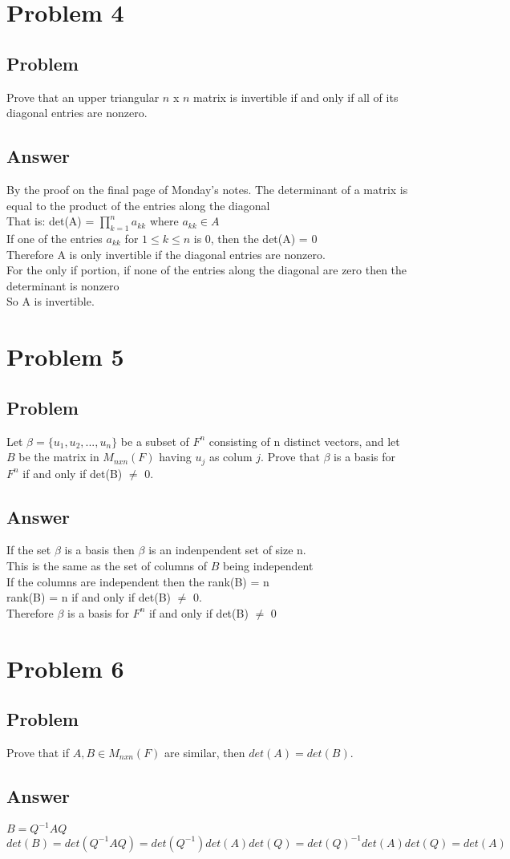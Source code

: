 \documentclass{article}
\begin{document}
\section*{Problem 4}
\subsection*{Problem}
Prove that an upper triangular \(n\) x \(n\) matrix is invertible if and only if all of its diagonal entries are nonzero.
\subsection*{Answer}
By the proof on the final page of Monday's notes. The determinant of a matrix is equal to the product of the entries along the diagonal
\\ That is: det(A) = \(\prod\limits_{k=1}^{n} a_{kk}\) where \(a_{kk} \in A\)
\\ If one of the entries \(a_{kk}\) for \(1 \le k \le n\) is 0, then the det(A) = 0
\\ Therefore A is only invertible if the diagonal entries are nonzero.
\\ For the only if portion, if none of the entries along the diagonal are zero then the determinant is nonzero
\\ So A is invertible.
\section*{Problem 5}
\subsection*{Problem}
Let \(\beta = \{u_{1},u_{2},...,u_{n}\}\) be a subset of \(F^{n}\) consisting of n distinct vectors, and let \(B\) be the matrix in \(M_{nxn}(F)\) having \(u_{j}\) as colum \(j\). Prove that \(\beta\) is a basis for \(F^{n}\) if and only if det(B) \(\ne\) 0.
\subsection*{Answer}
If the set \(\beta\) is a basis then \(\beta\) is an indenpendent set of size n.
\\This is the same as the set of columns of \(B\) being independent
\\If the columns are independent then the rank(B) = n
\\rank(B) = n if and only if det(B) \(\ne\) 0.
\\Therefore \(\beta\) is a basis for \(F^{n}\) if and only if det(B) \(\ne\) 0
\section*{Problem 6}
\subsection*{Problem}
Prove that if \(A,B \in M_{nxn}(F)\) are similar, then \(det(A) = det(B)\). 
\subsection*{Answer}
\(B = Q^{-1}AQ\)
\\\(det(B) = det(Q^{-1}AQ)=det(Q^{-1})det(A)det(Q) = det(Q)^{-1}det(A)det(Q) = det(A)\)
\end{document}
